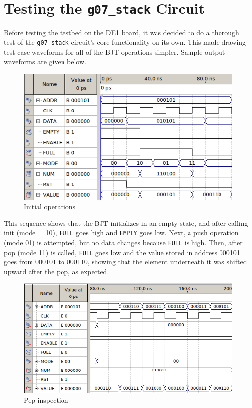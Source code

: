 \documentclass[12pt]{report}
\begin{document}
\chapter*{Testing the \texttt{g07\_stack} Circuit}
Before testing the testbed on the DE1 board, it was decided to do a thorough test of the
\texttt{g07\_stack} circuit's core functionality on its own. This made drawing test case waveforms
for all of the BJT operations simpler. Sample output waveforms are given below.
\begin{figure}[h]
	\begin{center}
		\caption{Initial operations}
		\includegraphics[scale=0.47]{stacktest_1}
	\end{center}
\end{figure}
This sequence shows that the BJT initializes in an empty state, and after calling init (mode = 10),
\texttt{FULL} goes high and \texttt{EMPTY} goes low. Next, a push operation (mode 01) is attempted,
but no data changes because \texttt{FULL} is high. Then, after pop (mode 11) is called,
\texttt{FULL} goes low and the value stored in address 000101 goes from 000101 to 000110, showing
that the element underneath it was shifted upward after the pop, as expected.
\begin{figure}[h]
	\begin{center}
		\caption{Pop inspection}
		\includegraphics[scale=0.5]{stacktest_2}
	\end{center}
\end{figure}
\end{document}
